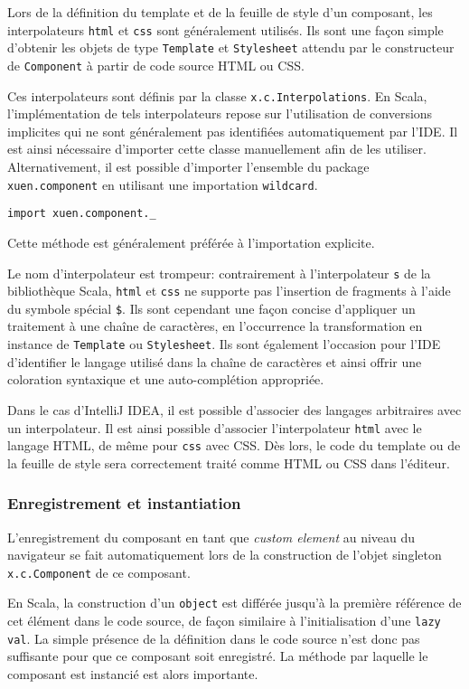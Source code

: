Lors de la définition du template et de la feuille de style d'un composant, les interpolateurs \texttt{html} et \texttt{css} sont généralement utilisés. Ils sont une façon simple d'obtenir les objets de type \texttt{Template} et \texttt{Stylesheet} attendu par le constructeur de \texttt{Component} à partir de code source HTML ou CSS.

Ces interpolateurs sont définis par la classe \texttt{x.c.Interpolations}. En Scala, l'implémentation de tels interpolateurs repose sur l'utilisation de conversions implicites qui ne sont généralement pas identifiées automatiquement par l'IDE. Il est ainsi nécessaire d'importer cette classe manuellement afin de les utiliser. Alternativement, il est possible d'importer l'ensemble du package \texttt{xuen.component} en utilisant une importation \texttt{wildcard}.
\begin{lstlisting}
import xuen.component._
\end{lstlisting}
Cette méthode est généralement préférée à l'importation explicite.

Le nom d'interpolateur est trompeur: contrairement à l'interpolateur \texttt{s} de la bibliothèque Scala, \texttt{html} et \texttt{css} ne supporte pas l'insertion de fragments à l'aide du symbole spécial \texttt{\$}. Ils sont cependant une façon concise d'appliquer un traitement à une chaîne de caractères, en l'occurrence la transformation en instance de \texttt{Template} ou \texttt{Stylesheet}. Ils sont également l'occasion pour l'IDE d'identifier le langage utilisé dans la chaîne de caractères et ainsi offrir une coloration syntaxique et une auto-complétion appropriée.

Dans le cas d'IntelliJ IDEA, il est possible d'associer des langages arbitraires avec un interpolateur. Il est ainsi possible d'associer l'interpolateur \texttt{html} avec le langage HTML, de même pour \texttt{css} avec CSS. Dès lors, le code du template ou de la feuille de style sera correctement traité comme HTML ou CSS dans l'éditeur.

\subsubsection{Enregistrement et instantiation}

L'enregistrement du composant en tant que \emph{custom element} au niveau du navigateur se fait automatiquement lors de la construction de l'objet singleton \texttt{x.c.Component} de ce composant.

En Scala, la construction d'un \texttt{object} est différée jusqu'à la première référence de cet élément dans le code source, de façon similaire à l'initialisation d'une \texttt{lazy val}. La simple présence de la définition dans le code source n'est donc pas suffisante pour que ce composant soit enregistré. La méthode par laquelle le composant est instancié est alors importante.


